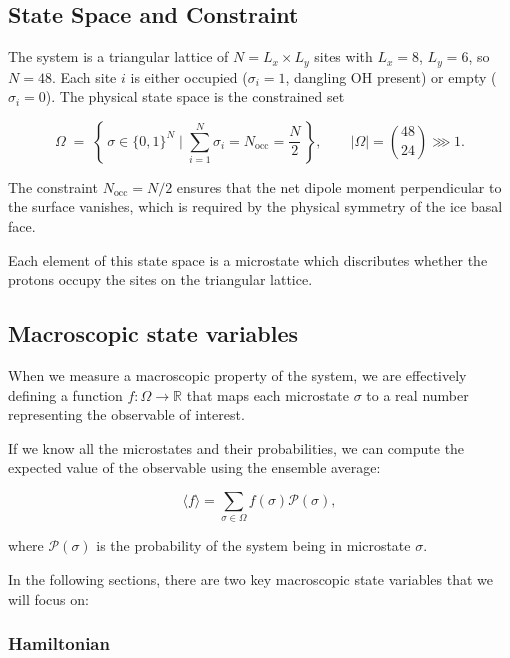 \documentclass[12pt, a4paper]{article}
\theoremstyle{definition}
\newcommand{\Nocc}{N_\mathrm{occ}}
\newcommand{\avgE}[1]{\langle #1 \rangle}
\begin{document}
\subsection{State Space and Constraint}

\hfill

The system is a triangular lattice of $N = L_x \times L_y$ sites
with $L_x = 8$, $L_y = 6$, so $N = 48$.
Each site $i$ is either occupied ($\sigma_i = 1$, dangling OH present)
or empty ($\sigma_i = 0$).
The physical state space is the constrained set

\begin{equation}
    \Omega \;=\; \left\{\, \sigma \in \{0,1\}^N \;\Big|\;
    \sum_{i=1}^{N} \sigma_i = \Nocc = \frac{N}{2} \,\right\},
    \qquad
    |\Omega| = \binom{48}{24} \ggg 1.
    \label{eq:state_space}
\end{equation}

The constraint $\Nocc = N/2$ ensures that the net dipole moment
perpendicular to the surface vanishes, which is required by the
physical symmetry of the ice basal face.

Each element of this state space is a microstate which discributes 
whether the protons occupy the sites on the triangular lattice.



\subsection{Macroscopic state variables}

\hfill

When we measure a macroscopic property of the system, we are effectively defining a function $f : \Omega \to \mathbb{R}$ that maps each microstate $\sigma$ to a real number representing the observable of interest.

If we know all the microstates and their probabilities, we can compute the expected value of the observable using the ensemble average:

\begin{equation}
    \avgE{f} = \sum_{\sigma \in \Omega} f(\sigma) \mathcal{P} (\sigma),
\end{equation}

where $\mathcal{P}(\sigma)$ is the probability of the system being in microstate $\sigma$.

In the following sections, there are two key macroscopic state variables that we will focus on:
\subsubsection{Hamiltonian}
\end{document}
